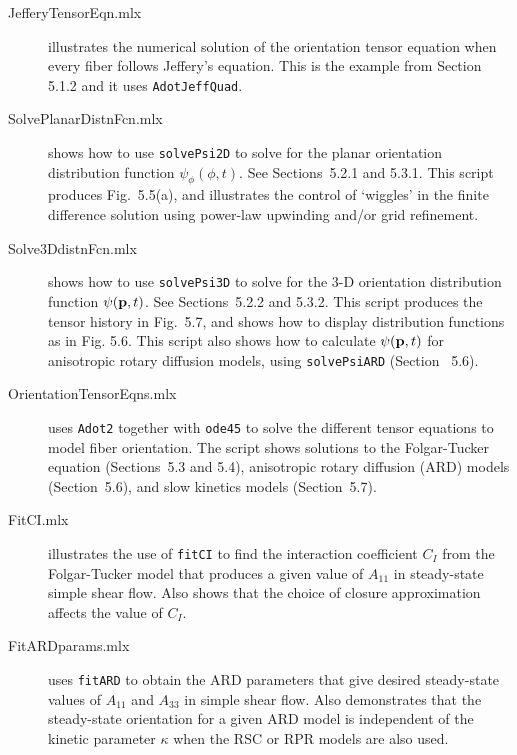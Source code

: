 \documentclass[11pt]{article}
\begin{document}
\begin{description}    

        \item[JefferyTensorEqn.mlx]{illustrates the numerical solution of the orientation tensor equation when every fiber follows Jeffery's equation.  This is the example from Section 5.1.2 and it uses \texttt{AdotJeffQuad}.}    

        \item[SolvePlanarDistnFcn.mlx]{shows how to use \texttt{solvePsi2D} to solve for the planar orientation distribution function $\psi_\phi (\phi, t)$.  See Sections~5.2.1 and 5.3.1.  This script produces Fig.~5.5(a), and illustrates the control of `wiggles' in the finite difference solution using power-law upwinding and/or grid refinement.}    

        \item[Solve3DdistnFcn.mlx]{shows how to use \texttt{solvePsi3D} to solve for the 3-D orientation distribution function $\psi (\mathbf{p}, t)$.  See Sections~5.2.2 and 5.3.2.  This script produces the tensor history in Fig.~5.7, and shows how to display distribution functions as in Fig. 5.6.  This script also shows how to calculate $\psi(\mathbf{p}, t)$ for anisotropic rotary diffusion models, using \texttt{solvePsiARD} (Section~ 5.6).  }    

        \item[OrientationTensorEqns.mlx]{uses \texttt{Adot2} together with \texttt{ode45} to solve the different tensor equations to model fiber orientation.  The script shows solutions to the Folgar-Tucker equation (Sections~5.3 and 5.4), anisotropic rotary diffusion (ARD) models (Section~5.6), and slow kinetics models (Section~5.7).}    
 
        \item[FitCI.mlx]{illustrates the use of \texttt{fitCI} to find the interaction coefficient $C_I$ from the Folgar-Tucker model that produces a given value of $A_{11}$ in steady-state simple shear flow.  Also shows that the choice of closure approximation affects the value of $C_I$.}   
 
        \item[FitARDparams.mlx]{uses \texttt{fitARD} to obtain the ARD parameters that give desired steady-state values of $A_{11}$ and $A_{33}$ in simple shear flow.  Also demonstrates that the steady-state orientation for a given ARD model is independent of the kinetic parameter $\kappa$ when the RSC or RPR models are also used.}   
        
\end{description}
\end{document}
